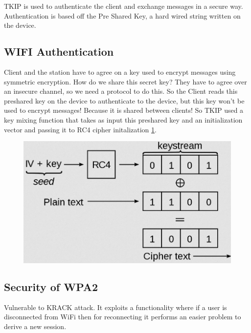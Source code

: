 TKIP is used to authenticate the client and exchange messages in a secure way.
Authentication is based off the Pre Shared Key, a hard wired string written on the device.

\subsection{WIFI Authentication}

Client and the station have to agree on a key used to encrypt messages using symmetric encryption. How do we share this secret key? They have to agree over an insecure channel, so we need a protocol to do this. So the Client reads this preshared key on the device to authenticate to the device, but this key won't be used to encrypt messages! Because it is shared between clients! So TKIP used a key mixing function that takes as input this preshared key and an initialization vector and passing it to RC4 cipher initalization \ref{fig:rc4_wep}.

\begin{figure}
	\centering
	\includegraphics[width=0.7\linewidth]{Images/Chapter2/rc4_wep}
	\caption{}
	\label{fig:rc4_wep}
\end{figure}

\subsection{Security of WPA2}

Vulnerable to KRACK attack. It exploits a functionality where if a user is disconnected from WiFi then for reconnecting it performs an easier problem to derive a new session.